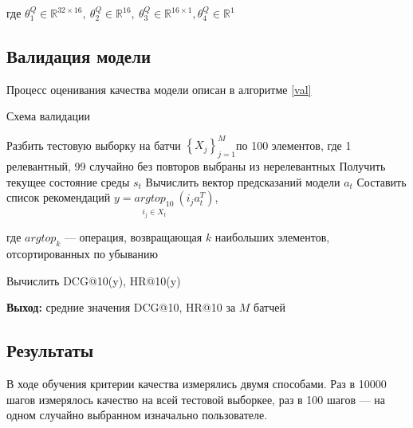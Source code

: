 \documentclass[14pt]{extarticle}
\begin{document}
где $\theta^{Q}_1 \in \mathbb{R}^{32\times 16},\ \theta^{Q}_2 \in \mathbb{R}^{16},\ \theta^{Q}_3 \in \mathbb{R}^{16\times1}, \theta^{Q}_4 \in \mathbb{R}^1$

\subsection{Валидация модели}

Процесс оценивания качества модели описан в алгоритме \ref{val}

\begin{algorithm}[H]
\caption{{Схема валидации}}
\label{val}

\begin{algorithmic}[1]
\STATE Разбить тестовую выборку на батчи $\left\{X_j\right\}_{j=1}^M$по 100 элементов, где 1 релевантный, 99 случайно без повторов выбраны из нерелевантных 
\STATE Получить текущее состояние среды $s_t$
\STATE Вычислить вектор предсказаний модели $a_t$
\STATE Составить список рекомендаций $y = \underset{i_j\in X_t}{argtop_{10}}\ \left(i_j a_t^T\right)$, 

где $argtop_k$ --- операция, возвращающая $k$ наибольших элементов, отсортированных по убыванию

\STATE Вычислить DCG@10(y), HR@10(y)
\ENDFOR

\hspace*{\algorithmicindent} \textbf{Выход:} средние значения DCG@10, HR@10 за $M$ батчей 
\end{algorithmic}
\end{algorithm}

\subsection{Результаты}

В ходе обучения критерии качества измерялись двумя способами. 
Раз в 10000 шагов измерялось качество на всей тестовой выборкее, раз в 100 шагов --- на одном случайно выбранном изначально пользователе.
\end{document}
